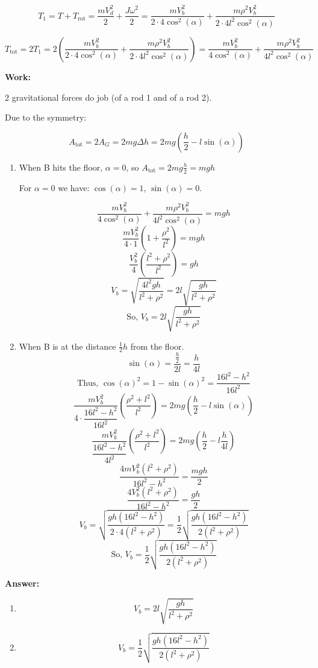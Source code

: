 \documentclass{article}
\begin{document}
\[T_1 = T + T_{\text{rot}} = \frac{mV_d^2}{2} + \frac{J \omega^2}{2} = \frac{m V_b^2}{2 \cdot 4 \cos^2(\alpha)} + \frac{m \rho^2 V_b^2}{2 \cdot 4l^2 \cos^2(\alpha)}\]

\[T_\text{tot} = 2T_1 = 2 (\frac{m V_b^2}{2 \cdot 4 \cos^2(\alpha)} + \frac{m \rho^2 V_b^2}{2 \cdot 4l^2 \cos^2(\alpha)}) = \frac{m V_b^2}{4 \cos^2(\alpha)} + \frac{m \rho^2 V_b^2}{4l^2 \cos^2(\alpha)}\]

\textbf{Work:}

2 gravitational forces do job (of a rod 1 and of a rod 2).

Due to the symmetry:

\[A_\text{tot} = 2A_G = 2 mg \Delta h = 2mg ( \frac{h}{2} - l \sin(\alpha))\]
 
\begin{enumerate}
  \item When B hits the floor, $\alpha = 0$, so $A_\text{tot} = 2 m g \frac{h}{2} = mgh$
    \begin{center}
      For $\alpha = 0$ we have: $\cos(\alpha) = 1$, $\sin(\alpha) = 0$.
    \end{center}
    \[ \frac{m V_b^2}{4 \cos^2(\alpha)} + \frac{m \rho^2 V_b^2}{4l^2 \cos^2(\alpha)} = mgh\]
    \[ \frac{m V_b^2}{4 \cdot 1} (1 + \frac{\rho^2}{l^2}) = mgh\]
    \[ \frac{V_b^2}{4} (\frac{l^2 + \rho^2}{l^2}) = gh\]
    \[ V_b = \sqrt{\dfrac{4l^2gh}{l^2 + \rho^2}} = 2l \sqrt{\dfrac{gh}{l^2 + \rho^2}}\]
    \[ \text{So, } V_b = 2l \sqrt{\dfrac{gh}{l^2 + \rho^2}}\]


  \item When B  is at the distance $ \frac{1}{2} h$ from the floor. 
    \[\sin(\alpha) = \dfrac{\frac{h}{2}}{2l} = \dfrac{h}{4l}\]
    \[\text{Thus, } \cos(\alpha)^2 = 1 - \sin(\alpha)^2 = \dfrac{16l^2 - h^2}{16l^2}\]
    \[ \frac{m V_b^2}{4 \cdot \dfrac{16l^2 - h^2}{16l^2}} (\dfrac{\rho^2 + l^2}{l^2}) = 2mg(\frac{h}{2} - l \sin(\alpha))\]
    \[ \frac{m V_b^2}{\dfrac{16l^2 - h^2}{4l^2}} (\dfrac{\rho^2 + l^2}{l^2}) = 2mg(\frac{h}{2} - l \frac{h}{4l})\]
    \[ \frac{4 mV_b^2 (l^2+\rho^2)}{16l^2 - h^2} = \dfrac{mgh}{2}\]
    \[ \frac{4 V_b^2 (l^2+\rho^2)}{16l^2 - h^2} = \dfrac{gh}{2}\]
    \[ V_b = \sqrt{\dfrac{gh(16l^2-h^2)}{2 \cdot 4(l^2 + \rho^2)}} = \dfrac{1}{2} \sqrt{\dfrac{gh(16l^2 - h^2)}{2(l^2 + \rho^2)}}\]
    \[ \text{So, } V_b = \dfrac{1}{2} \sqrt{\dfrac{gh(16l^2 - h^2)}{2(l^2 + \rho^2)}}\]
\end{enumerate}

\textbf{Answer:}
\begin{enumerate}
  \item \[V_b = 2l \sqrt{\dfrac{gh}{l^2 + \rho^2}}\]
  \item \[V_b = \dfrac{1}{2} \sqrt{\dfrac{gh(16l^2 - h^2)}{2(l^2 + \rho^2)}}\]
\end{enumerate}
\end{document}
